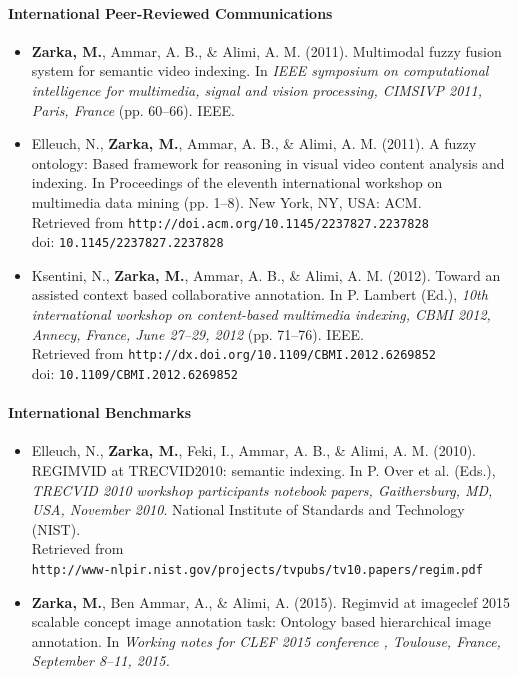 		\paragraph{International Peer-Reviewed Communications}
			\begin{itemize}
				\item \textbf{Zarka, M.}, Ammar, A. B., \&{} Alimi, A. M. (2011). 
				Multimodal fuzzy fusion system for semantic video indexing. 
				In \emph{IEEE symposium on computational intelligence for multimedia,
				signal and vision processing, CIMSIVP 2011, Paris, France} (pp. 60--66). IEEE.

				\item Elleuch, N., \textbf{Zarka, M.}, Ammar, A. B., \&{} Alimi, A. M. (2011). 
				A fuzzy ontology: Based framework for reasoning in visual video content analysis 
				and indexing. In Proceedings of the eleventh international 
				workshop on multimedia data mining (pp. 1--8). New York, NY, USA: ACM. \\
				Retrieved from \texttt{http://doi.acm.org/10.1145/2237827.2237828}\\
				doi: \texttt{10.1145/2237827.2237828}

				\item Ksentini, N., \textbf{Zarka, M.}, Ammar, A. B., \&{} Alimi, A. M. (2012). 
				Toward an assisted context based collaborative annotation. In P. Lambert (Ed.), 
				\emph{10th international workshop on content-based multimedia indexing, 
				CBMI 2012, Annecy, France, June 27--29, 2012} (pp. 71--76). IEEE.\\
				Retrieved from \texttt{http://dx.doi.org/10.1109/CBMI.2012.6269852}\\
				doi: \texttt{10.1109/CBMI.2012.6269852}
			\end{itemize}
		\paragraph{International Benchmarks}
			\begin{itemize}
				\item Elleuch, N., \textbf{Zarka, M.}, Feki, I., Ammar, A. B., 
				\&{} Alimi, A. M. (2010). REGIMVID at TRECVID2010: semantic 
				indexing. In P. Over et al. (Eds.), \emph{TRECVID 2010 workshop
				participants notebook papers, Gaithersburg, MD, USA, November 2010}. 
				National Institute of Standards and Technology (NIST). \\
				Retrieved from \\\texttt{http://www-nlpir.nist.gov/projects/tvpubs/tv10.papers/regim.pdf}

				\item \textbf{Zarka, M.}, Ben Ammar, A., \&{} Alimi, A. (2015). 
				Regimvid at imageclef 2015 scalable concept image annotation 
				task: Ontology based hierarchical image annotation. 
				In \emph{Working notes for CLEF 2015 conference , 
				Toulouse, France, September 8--11, 2015.}
			\end{itemize}


